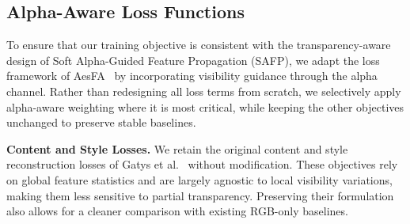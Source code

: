 \documentclass[letterpaper]{article} %
\begin{document}



\subsection{Alpha-Aware Loss Functions}

To ensure that our training objective is consistent with the transparency-aware design of Soft Alpha-Guided Feature Propagation (SAFP), we adapt the loss framework of AesFA~\cite{kwon2024aesfa} by incorporating visibility guidance through the alpha channel. Rather than redesigning all loss terms from scratch, we selectively apply alpha-aware weighting where it is most critical, while keeping the other objectives unchanged to preserve stable baselines.

\noindent\textbf{Content and Style Losses.}
We retain the original content and style reconstruction losses of Gatys et al.~\cite{gatys2016image} without modification. These objectives rely on global feature statistics and are largely agnostic to local visibility variations, making them less sensitive to partial transparency. Preserving their formulation also allows for a cleaner comparison with existing RGB-only baselines.
\end{document}
